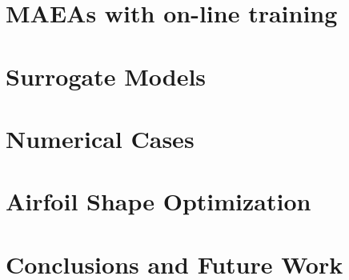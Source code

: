 \documentclass[twoside, 12pt,notitlepage]{report}
\begin{document}
\chapter{MAEAs with on-line training}


\chapter{Surrogate Models}


\chapter{Numerical Cases}


\chapter{Airfoil Shape Optimization}


\chapter{Conclusions and Future Work}



%

\appendix

\newpage
\end{document}
